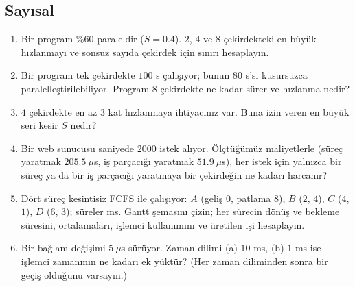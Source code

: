 \subsection*{Sayısal}
\begin{enumerate}[leftmargin=1.6em,resume]
  \item Bir program \%60 paraleldir ($S = 0.4$). $2$, $4$ ve $8$ çekirdekteki en büyük hızlanmayı ve sonsuz sayıda çekirdek için sınırı hesaplayın.
  \item Bir program tek çekirdekte $100$ s çalışıyor; bunun $80$ s'si kusursuzca paralelleştirilebiliyor. Program $8$ çekirdekte ne kadar sürer ve hızlanma nedir?
  \item $4$ çekirdekte en az $3$ kat hızlanmaya ihtiyacınız var. Buna izin veren en büyük seri kesir $S$ nedir?
  \item Bir web sunucusu saniyede $2000$ istek alıyor. Ölçtüğümüz maliyetlerle (süreç yaratmak $205.5\ \mu$s, iş parçacığı yaratmak $51.9\ \mu$s), her istek için yalnızca bir süreç ya da bir iş parçacığı yaratmaya bir çekirdeğin ne kadarı harcanır?
  \item Dört süreç kesintisiz FCFS ile çalışıyor: $A$ (geliş $0$, patlama $8$), $B$ ($2$, $4$), $C$ ($4$, $1$), $D$ ($6$, $3$); süreler ms. Gantt şemasını çizin; her sürecin dönüş ve bekleme süresini, ortalamaları, işlemci kullanımını ve üretilen işi hesaplayın.
  \item Bir bağlam değişimi $5\ \mu$s sürüyor. Zaman dilimi (a) $10$ ms, (b) $1$ ms ise işlemci zamanının ne kadarı ek yüktür? (Her zaman diliminden sonra bir geçiş olduğunu varsayın.)
\end{enumerate}

